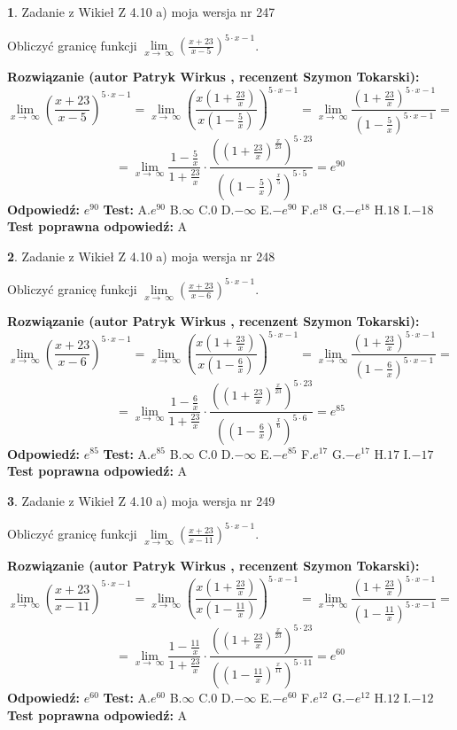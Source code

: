 \documentclass[12pt, a4paper]{article}
\theoremstyle{definition} %
\newtheorem{zad}{}
\newcommand{\zadStart}[1]{\begin{zad}#1\newline}
\newcommand{\zadStop}{\end{zad}}
\newcommand{\rozwStart}[2]{\noindent \textbf{Rozwiązanie (autor #1 , recenzent #2): }\newline}
\newcommand{\rozwStop}{\newline}
\newcommand{\odpStart}{\noindent \textbf{Odpowiedź:}\newline}
\newcommand{\odpStop}{\newline}
\newcommand{\testStart}{\noindent \textbf{Test:}\newline}
\newcommand{\testStop}{\newline}
\newcommand{\kluczStart}{\noindent \textbf{Test poprawna odpowiedź:}\newline}
\newcommand{\kluczStop}{\newline}
\begin{document}
\zadStart{Zadanie z Wikieł Z 4.10 a) moja wersja nr 247}

Obliczyć granicę funkcji  $\lim\limits_{x\to\ \infty}(\frac{x+23}{x-5})^{5\cdot x-1}$.
\zadStop
\rozwStart{Patryk Wirkus}{Szymon Tokarski}
$$\lim\limits_{x\to\ \infty}(\frac{x+23}{x-5})^{5\cdot x-1} = \lim\limits_{x\to\ \infty}(\frac{x(1+\frac{23}{x})}{x(1-\frac{5}{x})})^{5\cdot x-1}=\lim\limits_{x\to\ \infty}\frac{(1+\frac{23}{x})^{5\cdot x-1}}{(1-\frac{5}{x})^{5\cdot x-1}}=$$
$$=\lim\limits_{x\to\ \infty}\frac{1-\frac{5}{x}}{1+\frac{23}{x}}\cdot\frac{((1+\frac{23}{x})^{\frac{x}{23}})^{5\cdot23}}{((1-\frac{5}{x})^{\frac{x}{5}})^{5\cdot5}}=e^{90}$$
\rozwStop
\odpStart
$e^{90}$
\odpStop
\testStart
A.$e^{90}$ B.$\infty$ C.$0$ D.$-\infty$ E.$-e^{90}$
F.$e^{18}$ G.$-e^{18}$
H.$18$
I.$-18$
\testStop
\kluczStart
A
\kluczStop



\zadStart{Zadanie z Wikieł Z 4.10 a) moja wersja nr 248}

Obliczyć granicę funkcji  $\lim\limits_{x\to\ \infty}(\frac{x+23}{x-6})^{5\cdot x-1}$.
\zadStop
\rozwStart{Patryk Wirkus}{Szymon Tokarski}
$$\lim\limits_{x\to\ \infty}(\frac{x+23}{x-6})^{5\cdot x-1} = \lim\limits_{x\to\ \infty}(\frac{x(1+\frac{23}{x})}{x(1-\frac{6}{x})})^{5\cdot x-1}=\lim\limits_{x\to\ \infty}\frac{(1+\frac{23}{x})^{5\cdot x-1}}{(1-\frac{6}{x})^{5\cdot x-1}}=$$
$$=\lim\limits_{x\to\ \infty}\frac{1-\frac{6}{x}}{1+\frac{23}{x}}\cdot\frac{((1+\frac{23}{x})^{\frac{x}{23}})^{5\cdot23}}{((1-\frac{6}{x})^{\frac{x}{6}})^{5\cdot6}}=e^{85}$$
\rozwStop
\odpStart
$e^{85}$
\odpStop
\testStart
A.$e^{85}$ B.$\infty$ C.$0$ D.$-\infty$ E.$-e^{85}$
F.$e^{17}$ G.$-e^{17}$
H.$17$
I.$-17$
\testStop
\kluczStart
A
\kluczStop



\zadStart{Zadanie z Wikieł Z 4.10 a) moja wersja nr 249}

Obliczyć granicę funkcji  $\lim\limits_{x\to\ \infty}(\frac{x+23}{x-11})^{5\cdot x-1}$.
\zadStop
\rozwStart{Patryk Wirkus}{Szymon Tokarski}
$$\lim\limits_{x\to\ \infty}(\frac{x+23}{x-11})^{5\cdot x-1} = \lim\limits_{x\to\ \infty}(\frac{x(1+\frac{23}{x})}{x(1-\frac{11}{x})})^{5\cdot x-1}=\lim\limits_{x\to\ \infty}\frac{(1+\frac{23}{x})^{5\cdot x-1}}{(1-\frac{11}{x})^{5\cdot x-1}}=$$
$$=\lim\limits_{x\to\ \infty}\frac{1-\frac{11}{x}}{1+\frac{23}{x}}\cdot\frac{((1+\frac{23}{x})^{\frac{x}{23}})^{5\cdot23}}{((1-\frac{11}{x})^{\frac{x}{11}})^{5\cdot11}}=e^{60}$$
\rozwStop
\odpStart
$e^{60}$
\odpStop
\testStart
A.$e^{60}$ B.$\infty$ C.$0$ D.$-\infty$ E.$-e^{60}$
F.$e^{12}$ G.$-e^{12}$
H.$12$
I.$-12$
\testStop
\kluczStart
A
\kluczStop
\end{document}
